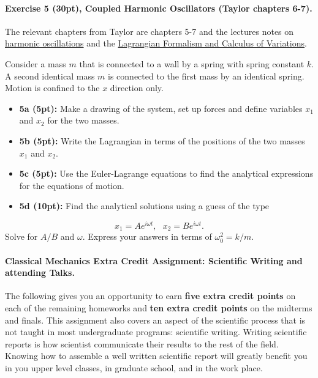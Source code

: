 \documentclass[%
oneside,                 %
final,                   %
10pt]{article}
\begin{document}
\noindent
\paragraph{Exercise 5 (30pt), Coupled Harmonic Oscillators  (Taylor chapters 6-7).}
The relevant chapters from Taylor are chapters 5-7 and the lectures notes on \href{{https://mhjensen.github.io/Physics321/doc/LectureNotes/_build/html/chapter5.html}}{harmonic oscillations} and the \href{{https://mhjensen.github.io/Physics321/doc/LectureNotes/_build/html/chapter8.html}}{Lagrangian Formalism and Calculus of Variations}. 

Consider a mass $m$ that is connected to a wall by a spring with
spring constant $k$. A second identical mass $m$ is connected to the
first mass by an identical spring. Motion is confined to the $x$ direction only.

\begin{itemize}
\item \textbf{5a (5pt):} Make a drawing of the system, set up forces and define variables $x_1$ and $x_2$ for the two masses.

\item \textbf{5b (5pt):} Write the Lagrangian in terms of the positions of the two masses $x_1$ and $x_2$.

\item \textbf{5c (5pt):} Use the Euler-Lagrange equations to find the analytical expressions for the  equations of motion.

\item \textbf{5d (10pt):} Find the analytical  solutions using a guess of  the type
\end{itemize}

\noindent
\[
x_1=Ae^{i\omega t},~~~x_2=Be^{i\omega t}.
\]
Solve for $A/B$ and $\omega$. Express your answers in terms of $\omega_0^2=k/m$.

\paragraph{Classical Mechanics Extra Credit Assignment: Scientific Writing and attending Talks.}
The following gives you an opportunity to earn \textbf{five extra credit
points} on each of the remaining homeworks and \textbf{ten extra credit points}
on the midterms and finals.  This assignment also covers an aspect of
the scientific process that is not taught in most undergraduate
programs: scientific writing.  Writing scientific reports is how
scientist communicate their results to the rest of the field.  Knowing
how to assemble a well written scientific report will greatly benefit
you in you upper level classes, in graduate school, and in the work
place.
\end{document}
